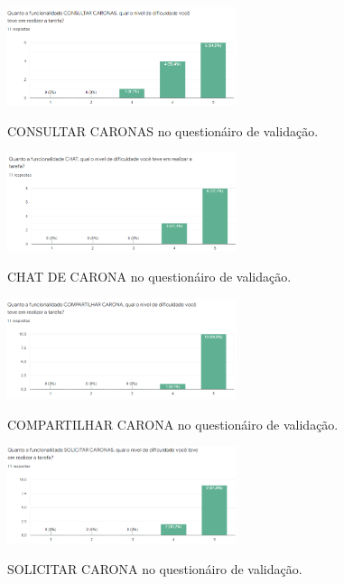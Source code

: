 \begin{figure}[H]
	\centering
	\caption{CONSULTAR CARONAS no questionáiro de validação.}
	\includegraphics[width=0.6\textwidth]{./04-figuras/validacao/consultar_caronas.png}
	\label{fig:consultar_caronas}
\end{figure}

\begin{figure}[H]
	\centering
	\caption{CHAT DE CARONA no questionáiro de validação.}
	\includegraphics[width=0.6\textwidth]{./04-figuras/validacao/chat.png}
	\label{fig:consultar_caronas}
\end{figure}

\begin{figure}[H]
	\centering
	\caption{COMPARTILHAR CARONA no questionáiro de validação.}
	\includegraphics[width=0.6\textwidth]{./04-figuras/validacao/compartilhar_caronas.png}
	\label{fig:compartilhar_carna}
\end{figure}

\begin{figure}[H]
	\centering
	\caption{SOLICITAR CARONA no questionáiro de validação.}
	\includegraphics[width=0.6\textwidth]{./04-figuras/validacao/solicitar_carona.png}
	\label{fig:solicitar_carona}
\end{figure}

